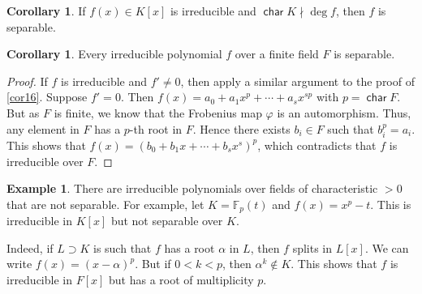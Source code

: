 \documentclass[10pt,letterpaper,cm]{nupset}
\theoremstyle{definition}
\newtheorem{exmp}[definition]{Example}
\theoremstyle{theorem}
\newtheorem{corollary}[definition]{Corollary}
\theoremstyle{remark}
\newcommand{\F}{\mathbb F}
\newcommand{\1}{\mathbf{1}}
\newcommand{\0}{\vec 0}
\DeclareMathOperator{\Char}{\mathsf{char}}
\begin{document}
\begin{corollary}
If $f(x) \in K[x]$ is irreducible and $\Char{K} \nmid \deg{f}$, then $f$ is separable. 
\end{corollary}

\begin{corollary}
Every irreducible polynomial $f$ over a finite field $F$ is separable. 
\end{corollary}
\begin{proof}
If $f$ is irreducible and $f' \ne 0$, then apply a similar argument to the proof of \cref{cor16}. Suppose $f'=0$. Then $f(x) = a_0 + a_1x^p + \cdots + a_sx^{sp}$ with $p= \Char{F}$. But as $F$ is finite, we know that the Frobenius map $\varphi$ is an automorphism. Thus, any element in $F$ has a $p$-th root in $F$. Hence there exists $b_i \in F$ such that $b_i^p = a_i$. This shows that $f(x) = \left(b_0 + b_1x + \cdots + b_sx^s\right)^p$, which contradicts that $f$ is irreducible over $F$.
\end{proof}

\begin{exmp}
There are irreducible polynomials over fields of characteristic $>0$ that are not separable. For example, let $K = \F_p(t)$ and $f(x) = x^p-t$. This is irreducible in $K[x]$ but not separable over $K$.

Indeed,  if $L \supset K$ is such that $f$ has a root $\alpha$ in $L$, then $f$ splits in $L[x]$. We can write $f(x) = \left(x-\alpha\right)^p$. But if $0 <k < p$, then $\alpha^k \notin K$. This shows that $f$ is irreducible in $F[x]$ but has a root of multiplicity $p$.
\end{exmp}
\end{document}
